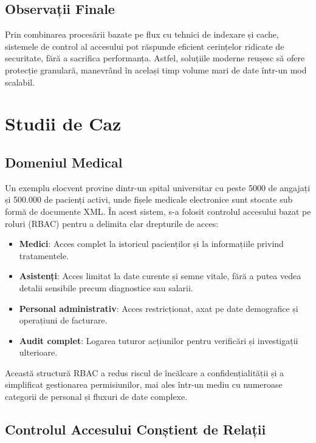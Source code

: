 \documentclass[runningheads]{llncs}
\begin{document}
\subsection{Observații Finale}

Prin combinarea procesării bazate pe flux cu tehnici de indexare și cache, sistemele de control al accesului pot răspunde eficient cerințelor ridicate de securitate, fără a sacrifica performanța. Astfel, soluțiile moderne reușesc să ofere protecție granulară, manevrând în același timp volume mari de date într-un mod scalabil.

\section{Studii de Caz}
\subsection{Domeniul Medical}

Un exemplu elocvent provine dintr-un spital universitar cu peste 5000 de angajați și 500.000 de pacienți activi, unde fișele medicale electronice sunt stocate sub formă de documente XML. În acest sistem, s-a folosit controlul accesului bazat pe roluri (RBAC) pentru a delimita clar drepturile de acces:

\begin{itemize}
   \item \textbf{Medici}: Acces complet la istoricul pacienților și la informațiile privind tratamentele.
   \item \textbf{Asistenți}: Acces limitat la date curente și semne vitale, fără a putea vedea detalii sensibile precum diagnostice sau salarii.
   \item \textbf{Personal administrativ}: Acces restricționat, axat pe date demografice și operațiuni de facturare.
   \item \textbf{Audit complet}: Logarea tuturor acțiunilor pentru verificări și investigații ulterioare.
\end{itemize}

Această structură RBAC a redus riscul de încălcare a confidențialității și a simplificat gestionarea permisiunilor, mai ales într-un mediu cu numeroase categorii de personal și fluxuri de date complexe.

\subsection{Controlul Accesului Conștient de Relații}
\end{document}
